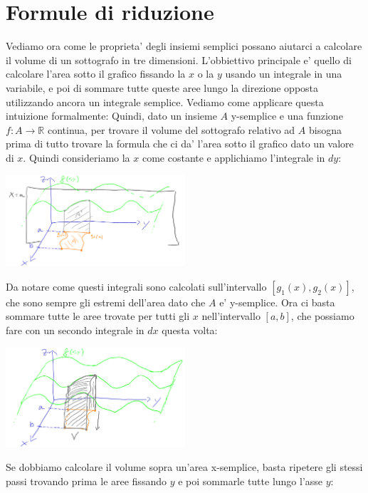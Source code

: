 \documentclass{report}
\begin{document}
\section{Formule di riduzione}
Vediamo ora come le proprieta' degli insiemi semplici possano aiutarci a calcolare il volume di un sottografo in tre dimensioni. L'obbiettivo principale e' quello di calcolare l'area sotto il grafico fissando la $ x $ o la $ y $ usando un integrale in una variabile, e poi di sommare tutte queste aree lungo la direzione opposta utilizzando ancora un integrale semplice. Vediamo come applicare questa intuizione formalmente:
Quindi, dato un insieme $ A $ y-semplice e una funzione $ f:A\to\mathbb{R} $ continua, per trovare il volume del sottografo relativo ad $ A $ bisogna prima di tutto trovare la formula che ci da' l'area sotto il grafico dato un valore di $ x $. Quindi consideriamo la $ x $ come costante e applichiamo l'integrale in $ dy $:
\begin{center}
  \includegraphics[width=0.5\textwidth]{img/2024-05-15-11-29-57.png}
\end{center}
Da notare come questi integrali sono calcolati sull'intervallo $ [g_1(x), g_2(x)] $, che sono sempre gli estremi dell'area dato che $ A $ e' y-semplice. Ora ci basta sommare tutte le aree trovate per tutti gli $ x $ nell'intervallo $ [a,b] $, che possiamo fare con un secondo integrale in $ dx $ questa volta:
\begin{center}
  \includegraphics[width=0.5\textwidth]{img/2024-05-15-11-45-00.png}
\end{center}
Se dobbiamo calcolare il volume sopra un'area x-semplice, basta ripetere gli stessi passi trovando prima le aree fissando $ y $ e poi sommarle tutte lungo l'asse $ y $:
\end{document}

